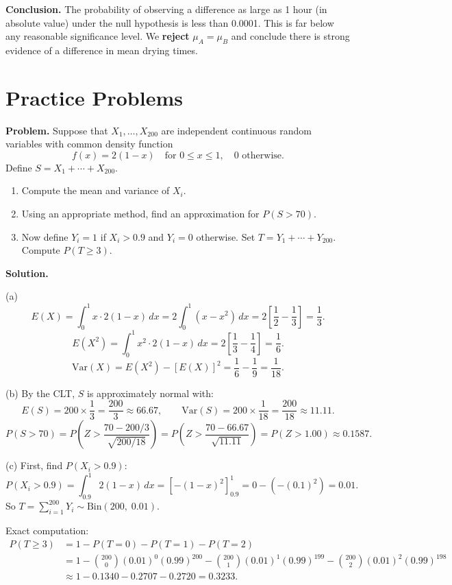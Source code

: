 \documentclass[10pt]{report}
\begin{document}
\textbf{Conclusion.} The probability of observing a difference as large as 1 hour (in absolute value) under the null hypothesis is less than 0.0001. This is far below any reasonable significance level. We \textbf{reject} $\mu_A = \mu_B$ and conclude there is strong evidence of a difference in mean drying times.

\bigskip

\section{Practice Problems}

\begin{hwbox}
\textbf{Problem.} Suppose that $X_1, \ldots, X_{200}$ are independent continuous random variables with common density function
\[
f(x) = 2(1-x) \quad \text{for } 0 \leq x \leq 1, \quad 0 \text{ otherwise.}
\]
Define $S = X_1 + \cdots + X_{200}$.

\begin{enumerate}[label=(\alph*)]
  \item Compute the mean and variance of $X_i$.
  \item Using an appropriate method, find an approximation for $P(S > 70)$.
  \item Now define $Y_i = 1$ if $X_i > 0.9$ and $Y_i = 0$ otherwise. Set $T = Y_1 + \cdots + Y_{200}$. Compute $P(T \geq 3)$.
\end{enumerate}

\textbf{Solution.}

(a) 
\[
E(X) = \int_0^1 x \cdot 2(1-x)\,dx = 2\int_0^1 (x - x^2)\,dx = 2\left[\frac{1}{2} - \frac{1}{3}\right] = \frac{1}{3}.
\]
\[
E(X^2) = \int_0^1 x^2 \cdot 2(1-x)\,dx = 2\left[\frac{1}{3} - \frac{1}{4}\right] = \frac{1}{6}.
\]
\[
\text{Var}(X) = E(X^2) - [E(X)]^2 = \frac{1}{6} - \frac{1}{9} = \frac{1}{18}.
\]

(b) By the CLT, $S$ is approximately normal with:
\[
E(S) = 200 \times \frac{1}{3} = \frac{200}{3} \approx 66.67, \qquad
\text{Var}(S) = 200 \times \frac{1}{18} = \frac{200}{18} \approx 11.11.
\]
\[
P(S > 70) = P\!\left(Z > \frac{70 - 200/3}{\sqrt{200/18}}\right) = P\!\left(Z > \frac{70 - 66.67}{\sqrt{11.11}}\right) = P(Z > 1.00) \approx 0.1587.
\]

(c) First, find $P(X_i > 0.9)$:
\[
P(X_i > 0.9) = \int_{0.9}^{1} 2(1-x)\,dx = \left[-(1-x)^2\right]_{0.9}^{1} = 0 - (-(0.1)^2) = 0.01.
\]
So $T = \sum_{i=1}^{200} Y_i \sim \text{Bin}(200,\; 0.01)$.

Exact computation:
\begin{align*}
P(T \geq 3) &= 1 - P(T = 0) - P(T = 1) - P(T = 2) \\
&= 1 - \binom{200}{0}(0.01)^0(0.99)^{200} - \binom{200}{1}(0.01)^1(0.99)^{199} - \binom{200}{2}(0.01)^2(0.99)^{198} \\
&\approx 1 - 0.1340 - 0.2707 - 0.2720 = \boxed{0.3233.}
\end{align*}
\end{hwbox}
\end{document}
